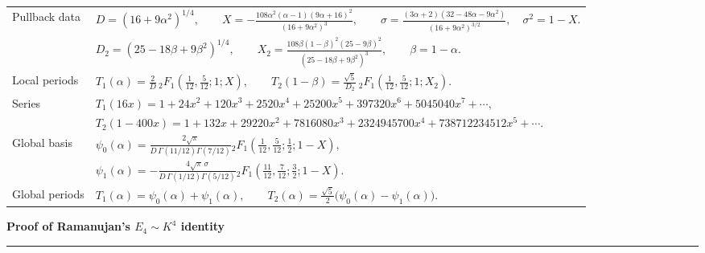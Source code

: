 \documentclass[9pt]{extarticle}
\begin{document}
{\fontsize{7.62}{10.38}\selectfont
\renewcommand{\arraystretch}{1.23}
\begin{tabularx}{\textwidth}{@{}H@{\hspace{0.10in}}Y@{}}
Pullback data &
$\displaystyle D=(16+9\alpha^2)^{1/4},\qquad
X=-\frac{108\alpha^2(\alpha-1)(9\alpha+16)^2}{(16+9\alpha^2)^3},\qquad
\sigma=\frac{(3\alpha+2)(32-48\alpha-9\alpha^2)}{(16+9\alpha^2)^{3/2}},\quad \sigma^2=1-X.$ \\[5pt]
& $\displaystyle D_2=(25-18\beta+9\beta^2)^{1/4},\qquad
X_2=\frac{108\beta(1-\beta)^2(25-9\beta)^2}{(25-18\beta+9\beta^2)^3},\qquad \beta=1-\alpha.$ \\[6pt]
Local periods &
$\displaystyle T_1(\alpha)=\frac2D\,{}_2F_1\!\left(\frac1{12},\frac5{12};1;X\right),\qquad
T_2(1-\beta)=\frac{\sqrt5}{D_2}\,{}_2F_1\!\left(\frac1{12},\frac5{12};1;X_2\right).$ \\[7pt]
Series &
$\displaystyle T_1(16x)=1+24x^2+120x^3+2520x^4+25200x^5+397320x^6+5045040x^7+\cdots,$ \\
& $\displaystyle T_2(1-400x)=1+132x+29220x^2+7816080x^3+2324945700x^4+738712234512x^5+\cdots.$ \\[7pt]
Global basis &
$\displaystyle
\psi_0(\alpha)=\frac{2\sqrt\pi}{D\,\Gamma(11/12)\Gamma(7/12)}
{}_2F_1\!\left(\frac1{12},\frac5{12};\frac12;1-X\right),$ \\[6pt]
& $\displaystyle
\psi_1(\alpha)=-\frac{4\sqrt\pi\,\sigma}{D\,\Gamma(1/12)\Gamma(5/12)}
{}_2F_1\!\left(\frac{11}{12},\frac7{12};\frac32;1-X\right).$ \\[8pt]
Global periods &
$\displaystyle T_1(\alpha)=\psi_0(\alpha)+\psi_1(\alpha),\qquad
T_2(\alpha)=\frac{\sqrt5}{2}\bigl(\psi_0(\alpha)-\psi_1(\alpha)\bigr).$
\end{tabularx}
}

\clearpage
\enlargethispage{24pt}
\vspace*{-10pt}
\noindent
\begin{minipage}[t]{0.70\textwidth}
{\fontsize{12.1}{13.6}\selectfont\bfseries Proof of Ramanujan's $E_4\sim K^4$ identity\par}
\end{minipage}\hfill
\begin{minipage}[t]{0.27\textwidth}
\end{minipage}
\par\vspace{3.5pt}
\noindent\rule{\textwidth}{0.45pt}
\vspace{5.0pt}
\end{document}
